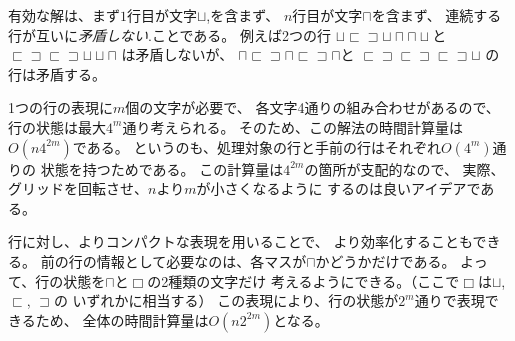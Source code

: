 有効な解は、まず$1$行目が文字$\sqcup$,を含まず、
$n$行目が文字$\sqcap$を含まず、
連続する行が互いに\emph{矛盾しない}.ことである。
例えば2つの行
$\sqcup \sqsubset \sqsupset \sqcup \sqcap \sqcap \sqcup$と
$\sqsubset \sqsupset \sqsubset \sqsupset \sqcup \sqcup \sqcap$ 
は矛盾しないが、
$\sqcap \sqsubset \sqsupset \sqcap \sqsubset \sqsupset \sqcap$と
$\sqsubset \sqsupset \sqsubset \sqsupset \sqsubset \sqsupset \sqcup$
の行は矛盾する。

\begin{comment}
Since a row consists of $m$ characters and there are
four choices for each character, the number of distinct
rows is at most $4^m$.
Thus, the time complexity of the solution is
$O(n 4^{2m})$ because we can go through the
$O(4^m)$ possible states for each row,
and for each state, there are $O(4^m)$
possible states for the previous row.
In practice, it is a good idea to rotate the grid
so that the shorter side has length $m$,
because the factor $4^{2m}$ dominates the time complexity.

It is possible to make the solution more efficient
by using a more compact representation for the rows.
It turns out that it is sufficient to know which
columns of the previous row contain the upper square
of a vertical tile.
Thus, we can represent a row using only characters
$\sqcap$ and $\Box$, where $\Box$ is a combination
of characters
$\sqcup$, $\sqsubset$ and $\sqsupset$.
Using this representation, there are only
$2^m$ distinct rows and the time complexity is
$O(n 2^{2m})$.
\end{comment}

1つの行の表現に$m$個の文字が必要で、
各文字4通りの組み合わせがあるので、
行の状態は最大$4^m$通り考えられる。
そのため、この解法の時間計算量は$O(n 4^{2m})$である。
というのも、処理対象の行と手前の行はそれぞれ$O(4^m)$通りの
状態を持つためである。
この計算量は$4^{2m}$の箇所が支配的なので、
実際、グリッドを回転させ、$n$より$m$が小さくなるように
するのは良いアイデアである。

行に対し、よりコンパクトな表現を用いることで、
より効率化することもできる。
前の行の情報として必要なのは、各マスが$\sqcap$かどうかだけである。
よって、行の状態を$\sqcap$と$\Box$の2種類の文字だけ
考えるようにできる。（ここで$\Box$は$\sqcup$, $\sqsubset$, $\sqsupset$の
いずれかに相当する）
この表現により、行の状態が$2^m$通りで表現できるため、
全体の時間計算量は$O(n 2^{2m})$となる。

\begin{comment}
As a final note, there is also a surprising direct formula
for calculating the number of tilings\footnote{Surprisingly,
this formula was discovered in 1961 by two research teams \cite{kas61,tem61}
that worked independently.}:
\[ \prod_{a=1}^{\lceil n/2 \rceil} \prod_{b=1}^{\lceil m/2 \rceil} 4 \cdot (\cos^2 \frac{\pi a}{n + 1} + \cos^2 \frac{\pi b}{m+1})\]
This formula is very efficient, because it calculates
the number of tilings in $O(nm)$ time,
but since the answer is a product of real numbers,
a problem when using the formula is
how to store the intermediate results accurately.
\end{comment}

